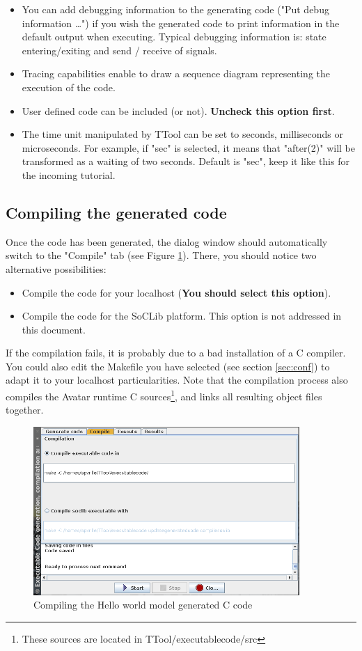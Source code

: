 \documentclass[12pt]{article}
\begin{document}
\begin{itemize}
\item You can add debugging information to the generating code ("Put debug information \ldots") if you wish the generated code to print information in the default output when executing. Typical debugging information is: state entering/exiting and send / receive of signals.
\item Tracing capabilities enable to draw a sequence diagram representing the execution of the code.
\item User defined code can be included (or not). \textbf{Uncheck this option first}.
\item The time unit manipulated by TTool can be set to seconds, milliseconds or microseconds. For example, if "sec" is selected, it means that  "after(2)" will be transformed as a waiting of two seconds. Default is "sec", keep it like this for the incoming tutorial.
\end{itemize}

\subsection{Compiling the generated code}
Once the code has been generated, the dialog window should automatically switch to the "Compile" tab (see Figure \ref{fig:compilehelloworld}). There, you should notice two alternative possibilities:
\begin{itemize}
\item Compile the code for your localhost (\textbf{You should select this option}).
\item Compile the code for the SoCLib platform. This option is not addressed in this document.
\end{itemize}
If the compilation fails, it is probably due to a bad installation of a C compiler. You could also edit the Makefile you have selected (see section \ref{sec:conf}) to adapt it to your localhost particularities.  Note that the compilation process also compiles the Avatar runtime C sources\footnote{These sources are located in TTool/executablecode/src}, and links all resulting object files together.

\begin{figure}[htbp]
\centering
\includegraphics[width=0.9\textwidth]{figures/compilehelloworld}
\caption{Compiling the Hello world model generated C code} \label{fig:compilehelloworld}
\end{figure}
\end{document}
